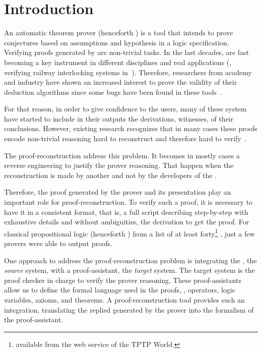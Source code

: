 \documentclass[../main.tex]{subfiles}
\begin{document}

\section{Introduction}
\label{sec:introduction}

An automatic theorem prover (henceforth \ATP) is a tool that intends to prove
conjectures based on assumptions and hypothesis in a logic specification.
Verifying proofs generated by \ATPs are non-trivial tasks.
In the last decades, \ATPs are fast becoming a key instrument in
different disciplines and real applications (\eg, verifying railway
interlocking systems in~\cite{Kanso2012}).
Therefore, researchers from academy and industry have shown an increased
interest to prove the validity of their deduction algorithms since
some bugs have been found in these
tools~\cite{Keller2013,Bohme2011,Fleury2014}.

For that reason, in order to give confidence to the \ATP users,
many of these system have started to include in their outputs the derivations, witnesses, of their conclusions.
However, existing research recognizes that in many cases these proofs encode
non-trivial reasoning
hard to reconstruct and therefore hard to verify~\cite{paulson2007source,Keller2013}.

The proof-reconstruction address this problem. It becomes in mostly cases a reverse engineering to justify the prover reasoning. That happen when the reconstruction is made by another and not by the developers of the \ATP.

Therefore, the proof generated by the prover and its presentation play an
important role for proof-reconstruction. To verify such a proof, it is
necessary to have it in a consistent format, that is, a full script describing
step-by-step with exhaustive details and without ambiguities, the derivation
to get the proof. For classical propositional logic (henceforth \CPL) from a
list of at least forty\footnote{\ATPs available from the web service
 of the TPTP World.} \ATPs, just a few provers were able to
output proofs.

One approach to address the proof-reconstruction problem is integrating the
\ATP, the \emph{source} system, with a proof-assistant, the \emph{target}
system. The target system is the proof checker in charge to  verify the prover reasoning.
These proof-assistants allow us to define the formal
language used in the proofs, \ie, operators, logic variables, axioms, and
theorems. A proof-reconstruction tool provides such an integration,
translating the replied generated by the prover into the formalism of the
proof-assistant.
\end{document}
